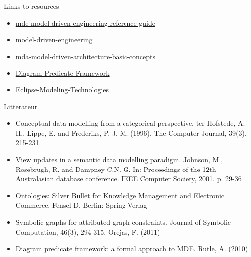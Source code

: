 \documentclass[slidetop,mathserif,red]{beamer}
\begin{document}
\begin{frame}{Links to resources}
    \begin{itemize}
    \item \href{http://www.theenterprisearchitect.eu/archive/2009/01/15/mde---model-driven-engineering----reference-guide }{\textcolor[rgb]{0.00,0.00,1.00}{mde-model-driven-engineering-reference-guide}}

    \item \href{http://www.theenterprisearchitect.eu/archive/2008/03/14/model_driven_engineering}{\textcolor[rgb]{0.00,0.00,1.00}{model-driven-engineering}}

    \item \href{http://www.theenterprisearchitect.eu/archive/2008/01/16/mda-model-driven-architecture-basic-concepts}{\textcolor[rgb]{0.00,0.00,1.00}{mda-model-driven-architecture-basic-concepts}}

    \item \href{http://dpf.hib.no/}{\textcolor[rgb]{0.00,0.00,1.00}{\textcolor[rgb]{0.00,0.00,1.00}{Diagram-Predicate-Framework}}}

    \item \href{http://www.eclipse.org/modeling/}{\textcolor[rgb]{0.00,0.00,1.00}{\textcolor[rgb]{0.00,0.00,1.00}{Eclipse-Modeling-Technologies}}}

  \end{itemize}
\end{frame}


\begin{frame}{Litterateur}
    \begin{itemize}
    \item Conceptual data modelling from a categorical perspective. ter Hofstede, A. H., Lippe, E. and  Frederiks, P. J. M. (1996), The Computer Journal, 39(3), 215-231.
    
    \item View updates in a semantic data modelling paradigm. Johnson, M., Rosebrugh, R. and  Dampney C.N. G.  In: Proceedings of the 12th Australasian database conference. IEEE Computer Society, 2001. p. 29-36

   \item Ontologies: Silver Bullet for Knowledge Management and Electronic Commerce. Fensel D. Berlin: Spring-Verlag

   \item Symbolic graphs for attributed graph constraints. Journal of Symbolic Computation, 46(3), 294-315. Orejas, F. (2011)

	\item Diagram predicate framework: a formal approach to MDE. Rutle, A. (2010)

  \end{itemize}
  \end{frame}
\end{document}
